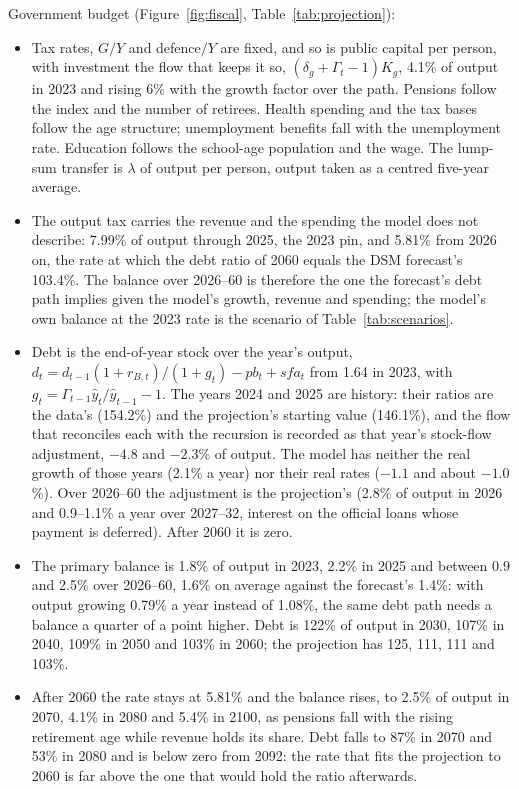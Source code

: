 \documentclass[11pt,a4paper]{article}
\begin{document}
\noindent Government budget (Figure~\ref{fig:fiscal}, Table~\ref{tab:projection}):
\begin{itemize}
\item Tax rates, $G/Y$ and defence$/Y$ are fixed, and so is public capital
  per person, with investment the flow that keeps it so,
  $(\delta_g+\Gamma_t-1)K_g$, 4.1\% of output in 2023 and rising 6\% with
  the growth factor over the path. Pensions
  follow the index and the number of retirees. Health spending and the tax
  bases follow the age structure; unemployment benefits fall with the
  unemployment rate. Education follows the school-age population and the
  wage. The lump-sum transfer is $\lambda$ of output per person, output
  taken as a centred five-year average.
\item The output tax carries the revenue and the spending the model does
  not describe: 7.99\% of output through 2025, the 2023 pin, and 5.81\%
  from 2026 on, the rate at which the debt ratio of 2060 equals the
  DSM forecast's 103.4\%. The balance over 2026--60 is therefore the one
  the forecast's debt path implies given the model's growth, revenue and
  spending; the model's own balance at the 2023 rate is the scenario of
  Table~\ref{tab:scenarios}.
\item Debt is the end-of-year stock over the year's output,
  $d_t=d_{t-1}(1+r_{B,t})/(1+g_t)-pb_t+sfa_t$ from 1.64 in 2023, with
  $g_t=\Gamma_{t-1}\hat y_t/\hat y_{t-1}-1$. The years 2024 and 2025 are
  history: their ratios are the data's (154.2\%) and the projection's
  starting value (146.1\%), and the flow that reconciles each with the
  recursion is recorded as that year's stock-flow adjustment, $-4.8$ and
  $-2.3$\% of output. The model has neither the real growth of those years
  (2.1\% a year) nor their real rates ($-1.1$ and about $-1.0$\%). Over
  2026--60 the adjustment is the projection's (2.8\% of output in 2026 and
  0.9--1.1\% a year over 2027--32, interest on the official loans whose
  payment is deferred). After 2060 it is zero.
\item The primary balance is 1.8\% of output in 2023, 2.2\% in 2025 and
  between 0.9 and 2.5\% over 2026--60, 1.6\% on average against the
  forecast's 1.4\%: with output growing 0.79\% a year instead of 1.08\%,
  the same debt path needs a balance a quarter of a point higher. Debt is
  122\% of output in 2030, 107\% in 2040, 109\% in 2050 and 103\% in 2060;
  the projection has 125, 111, 111 and 103\%.
\item After 2060 the rate stays at 5.81\% and the balance rises, to 2.5\%
  of output in 2070, 4.1\% in 2080 and 5.4\% in 2100, as pensions fall
  with the rising retirement age while revenue holds its share. Debt falls
  to 87\% in 2070 and 53\% in 2080 and is below zero from 2092: the rate
  that fits the projection to 2060 is far above the one that would hold the
  ratio afterwards.
\end{itemize}
\end{document}
